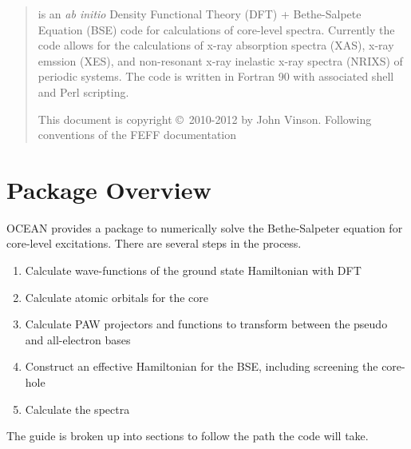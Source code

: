 \documentclass[11pt]{report}
\begin{document}
\MakeTitle

\newchapter{}
\begin{abstract}
\OCEAN{} is an {\it ab initio} Density Functional Theory (DFT) + Bethe-Salpete Equation (BSE) code for calculations of core-level 
spectra. Currently the code allows for the calculations of x-ray absorption spectra (XAS), x-ray emssion (XES), and non-resonant x-ray 
inelastic x-ray spectra (NRIXS) of periodic systems. The code is written in Fortran 90 with associated shell and Perl scripting.




 \noindent This document is copyright \copyright\ 2010-2012 by John Vinson. Following conventions of the FEFF documentation

\end{abstract}

\newchapter{}
\tableofcontents
\newchapter{}

\setcounter{page}{1}


\chapter{Package Overview}



OCEAN provides a package to numerically solve the Bethe-Salpeter equation for core-level excitations. There are several steps in the process.
\begin{enumerate}
\item Calculate wave-functions of the ground state Hamiltonian with DFT
\item Calculate atomic orbitals for the core
\item Calculate PAW projectors and functions to transform between the pseudo and all-electron bases
\item Construct an effective Hamiltonian for the BSE, including screening the core-hole
\item Calculate the spectra
\end{enumerate}

The guide is broken up into sections to follow the path the code will take.
\end{document}
